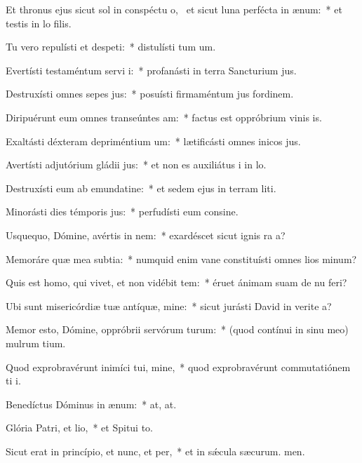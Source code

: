 \item Et thronus ejus sicut sol in conspéctu o,~\pscross{} et sicut luna perfécta in ænum:~* et testis in lo filis.
\item Tu vero repulísti et despeti:~* distulísti tum um.
\item Evertísti testaméntum servi i:~* profanásti in terra Sancturium jus.
\item Destruxísti omnes sepes jus:~* posuísti firmaméntum jus fordinem.
\item Diripuérunt eum omnes transeúntes am:~* factus est oppróbrium vinis is.
\item Exaltásti déxteram depriméntium um:~* lætificásti omnes inicos jus.
\item Avertísti adjutórium gládii jus:~* et non es auxiliátus i in lo.
\item Destruxísti eum ab emundatine:~* et sedem ejus in terram liti.
\item Minorásti dies témporis jus:~* perfudísti eum consine.
\item Usquequo, Dómine, avértis in nem:~* exardéscet sicut ignis ra a?
\item Memoráre quæ mea subtia:~* numquid enim vane constituísti omnes lios minum?
\item Quis est homo, qui vivet, et non vidébit tem:~* éruet ánimam suam de nu feri?
\item Ubi sunt misericórdiæ tuæ antíquæ, mine:~* sicut jurásti David in verite a?
\item Memor esto, Dómine, oppróbrii servórum turum:~* (quod contínui in sinu meo) mulrum tium.
\item Quod exprobravérunt inimíci tui, mine,~* quod exprobravérunt commutatiónem ti i.
\item Benedíctus Dóminus in ænum:~* at, at.
\item Glória Patri, et lio,~* et Spitui to.
\item Sicut erat in princípio, et nunc, et per,~* et in sǽcula sæcurum. men.
